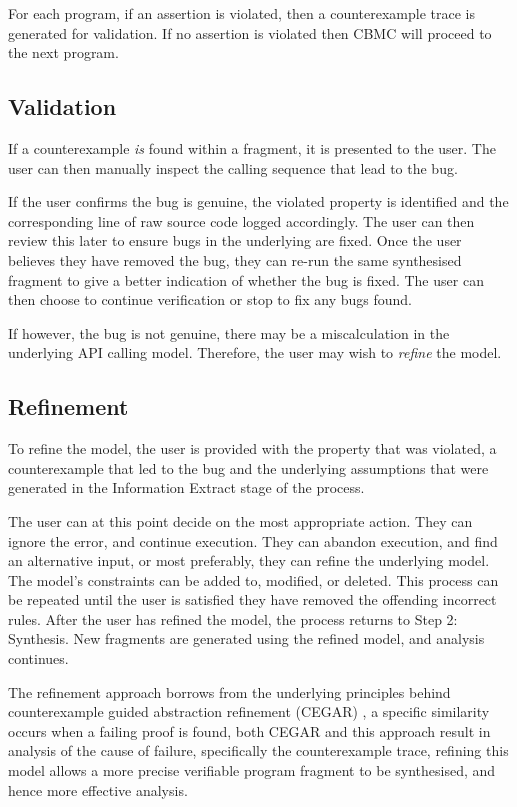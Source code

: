 \documentclass[EPiC]{easychair}
\begin{document}
For each program, if an assertion is violated, then a counterexample trace is generated for validation.  If no assertion is violated then CBMC will proceed to the next program.

\subsection{Validation}
\label{sec:validation}
If a counterexample \emph{is} found within a fragment, it is presented to the user.   The user can then manually inspect the calling sequence that lead to the bug.  

If the user confirms the bug is genuine, the violated property is identified and the corresponding line of raw source code logged accordingly.  The user can then review this later to ensure bugs in the underlying are fixed.  Once the user believes they have removed the bug, they can re-run the same synthesised fragment to give a better indication of whether the bug is fixed.  The user can then choose to continue verification or stop to fix any bugs found.

If however, the bug is not genuine, there may be a miscalculation in the underlying API calling model.  Therefore, the user may wish to \emph{refine} the model.


\subsection{Refinement}
\label{sec:refinement}
To refine the model, the user is provided with the property that was violated, a counterexample that led to the bug and the underlying assumptions that were generated in the Information Extract stage of the process.

The user can at this point decide on the most appropriate action.  They can ignore the error, and continue execution.  They can abandon execution, and find an alternative input, or most preferably, they can refine the underlying model.  The model's constraints can be added to, modified, or deleted.  This process can be repeated until the user is satisfied they have removed the offending incorrect rules.  After the user has refined the model,  the process returns to Step 2:  Synthesis.  New fragments are generated using the refined model, and analysis continues.

The refinement approach borrows from the underlying principles behind counterexample guided abstraction refinement (CEGAR) \cite{Clarke2000}, a specific similarity occurs when a failing proof is found, both CEGAR and this approach result in analysis of the cause of failure, specifically the counterexample trace, refining this model allows a more precise verifiable program fragment to be synthesised, and hence more effective analysis.
\end{document}
